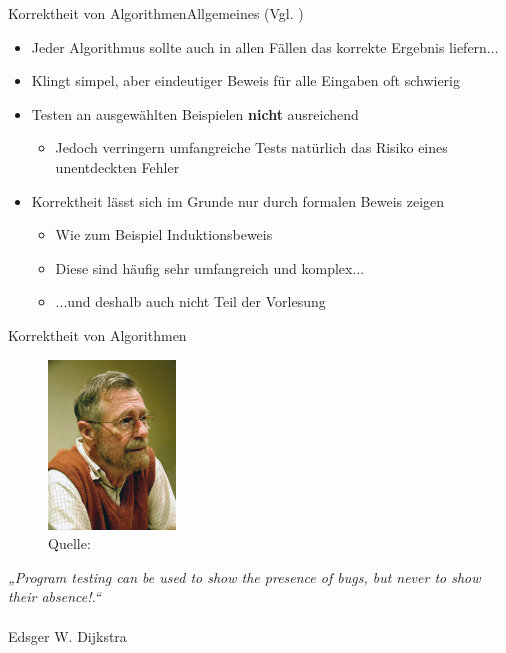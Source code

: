 
\begin{frame}{Korrektheit von Algorithmen}{Allgemeines (Vgl. \cite{wiki:algo})}
    \begin{itemize}[<+->]
        \item Jeder Algorithmus sollte auch in allen Fällen das korrekte Ergebnis liefern...
        \item Klingt simpel, aber eindeutiger Beweis für alle Eingaben oft schwierig
        \item Testen an ausgewählten Beispielen \textbf{nicht} ausreichend
        \begin{itemize}
            \item Jedoch verringern umfangreiche Tests natürlich das Risiko eines unentdeckten Fehler
        \end{itemize}
        \item Korrektheit lässt sich im Grunde nur durch formalen Beweis zeigen
        \begin{itemize}
            \item Wie zum Beispiel Induktionsbeweis
            \item Diese sind häufig sehr umfangreich und komplex...
            \item ...und deshalb auch nicht Teil der Vorlesung
        \end{itemize}
    \end{itemize}
\end{frame}

\begin{frame}{Korrektheit von Algorithmen}{}
\begin{minipage}{0.4\textwidth}
            \begin{figure}
                \includegraphics[height=4.5cm]{graph/dijkstra}
                \caption*{Quelle: \cite{wiki:dijkstra}}
            \end{figure}
        \end{minipage}
        \hfill
        \begin{minipage}{0.55\textwidth}
            \textit{„Program testing can be used to show the presence of bugs, but never to show their absence!.“} \\\\Edsger W. Dijkstra
        \end{minipage}
\end{frame}

